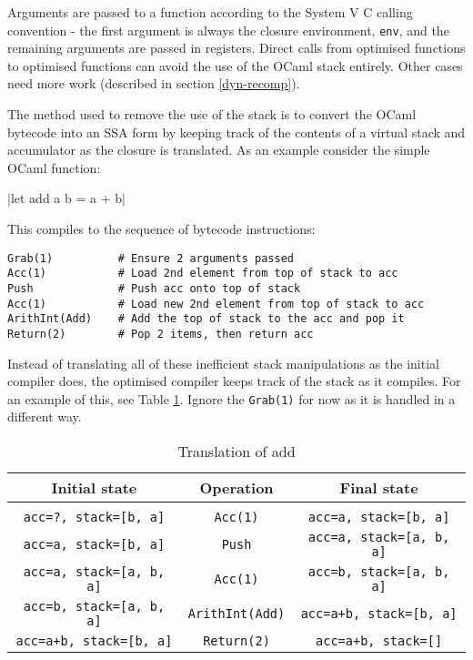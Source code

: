 Arguments are passed to a function according to the System V C calling convention - the first
argument is always the closure environment, \texttt{env}, and the remaining arguments are passed
in registers. Direct calls from optimised functions to optimised functions can avoid the use of
the OCaml stack entirely. Other cases need more work (described in section \ref{dyn-recomp}).

The method used to remove the use of the stack is to convert the OCaml bytecode into an SSA form
by keeping track of the contents of a virtual stack and accumulator as the closure is translated.
As an example consider the simple OCaml function:

|let add a b = a + b|

This compiles to the sequence of bytecode instructions:

\begin{verbatim}
Grab(1)          # Ensure 2 arguments passed
Acc(1)           # Load 2nd element from top of stack to acc
Push             # Push acc onto top of stack
Acc(1)           # Load new 2nd element from top of stack to acc
ArithInt(Add)    # Add the top of stack to the acc and pop it
Return(2)        # Pop 2 items, then return acc
\end{verbatim}

Instead of translating all of these inefficient stack manipulations as the initial compiler does,
the optimised compiler keeps track of the stack as it compiles. For an example of this, see Table
\ref{table:stacktrans}. Ignore the \texttt{Grab(1)} for
now as it is handled in a different way.

\begin{table}[h]
      \centering
      \begin{tabular}{ccc}\toprule
            Initial state                   & Operation              & Final state
            \\
            \midrule
            \\
            \texttt{acc=?, stack=[b, a]}    & \texttt{Acc(1)}        & \texttt{acc=a, stack=[b, a]}
            \\
            \texttt{acc=a, stack=[b, a]}    & \texttt{Push}          & \texttt{acc=a, stack=[a, b,
                              a]}
            \\
            \texttt{acc=a, stack=[a, b, a]} & \texttt{Acc(1)}        & \texttt{acc=b, stack=[a, b,
                              a]}
            \\
            \texttt{acc=b, stack=[a, b, a]} & \texttt{ArithInt(Add)} & \texttt{acc=a+b, stack=[b,
                              a]}
            \\
            \texttt{acc=a+b, stack=[b, a]}  & \texttt{Return(2)}     & \texttt{acc=a+b, stack=[]}
            \\
            \bottomrule
      \end{tabular}

      \caption{Translation of add}
      \label{table:stacktrans}
\end{table}


